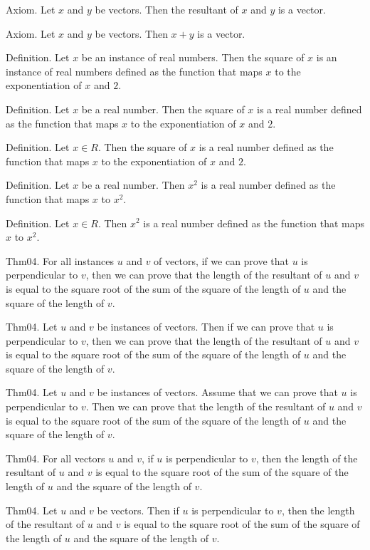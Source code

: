 \documentclass{article}
\begin{document}
Axiom. Let $x$ and $y$ be vectors. Then the resultant of $x$ and $y$ is a vector.

Axiom. Let $x$ and $y$ be vectors. Then $x + y$ is a vector.

Definition. Let $x$ be an instance of real numbers. Then the square of $x$ is an instance of real numbers defined as the function that maps $x$ to the exponentiation of $x$ and $2$.

Definition. Let $x$ be a real number. Then the square of $x$ is a real number defined as the function that maps $x$ to the exponentiation of $x$ and $2$.

Definition. Let $x \in R$. Then the square of $x$ is a real number defined as the function that maps $x$ to the exponentiation of $x$ and $2$.

Definition. Let $x$ be a real number. Then $x ^{ 2}$ is a real number defined as the function that maps $x$ to ${x }^{ 2}$.

Definition. Let $x \in R$. Then $x ^{ 2}$ is a real number defined as the function that maps $x$ to ${x }^{ 2}$.

Thm04. For all instances $u$ and $v$ of vectors, if we can prove that $u$ is perpendicular to $v$, then we can prove that the length of the resultant of $u$ and $v$ is equal to the square root of the sum of the square of the length of $u$ and the square of the length of $v$.

Thm04. Let $u$ and $v$ be instances of vectors. Then if we can prove that $u$ is perpendicular to $v$, then we can prove that the length of the resultant of $u$ and $v$ is equal to the square root of the sum of the square of the length of $u$ and the square of the length of $v$.

Thm04. Let $u$ and $v$ be instances of vectors. Assume that we can prove that $u$ is perpendicular to $v$. Then we can prove that the length of the resultant of $u$ and $v$ is equal to the square root of the sum of the square of the length of $u$ and the square of the length of $v$.

Thm04. For all vectors $u$ and $v$, if $u$ is perpendicular to $v$, then the length of the resultant of $u$ and $v$ is equal to the square root of the sum of the square of the length of $u$ and the square of the length of $v$.

Thm04. Let $u$ and $v$ be vectors. Then if $u$ is perpendicular to $v$, then the length of the resultant of $u$ and $v$ is equal to the square root of the sum of the square of the length of $u$ and the square of the length of $v$.
\end{document}
